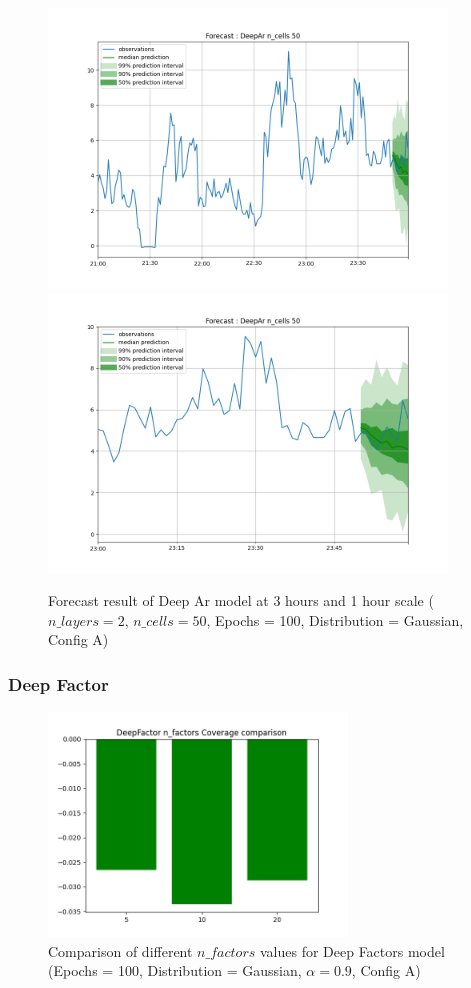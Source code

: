 \begin{figure}[H]
    \centering
    \includegraphics[width=400px]{plots/forecast/a/DeepAr/n_cells/50/180.png}
    \includegraphics[width=400px]{plots/forecast/a/DeepAr/n_cells/50/60.png}
    \caption{Forecast result of Deep Ar model at 3 hours and 1 hour scale ($n\_layers = 2$, $n\_cells = 50$, Epochs = 100, Distribution = Gaussian, Config A)}
    \label{fig:deepar}
\end{figure}

\subsubsection{Deep Factor} \label{comp_deepfactor}

\begin{figure}[H]
    \centering
    \includegraphics[width=300px]{plots/hist/a/DeepFactor/n_factors/Coverage.png}
    \caption{Comparison of different $n\_factors$ values for Deep Factors model (Epochs = 100, Distribution = Gaussian, $\alpha = 0.9$, Config A)}
    \label{fig:comp_deepfactor_n_factors}
\end{figure}

